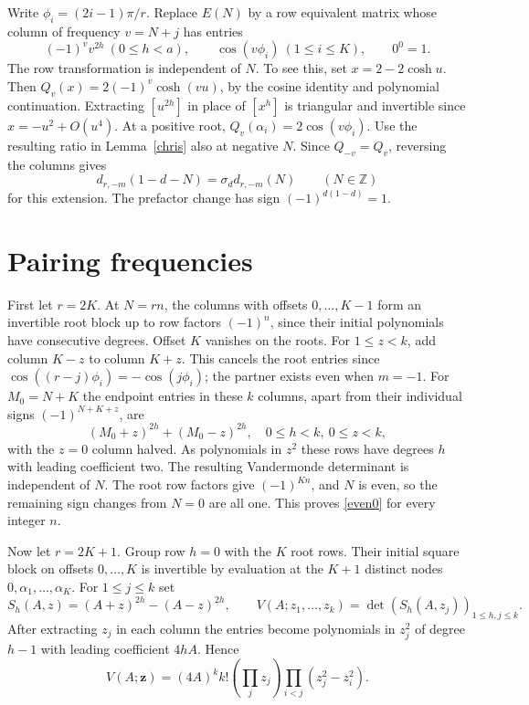 \documentclass[11pt]{article}
\newcommand{\Z}{\mathbb Z}
\begin{document}
Write $\phi_i=(2i-1)\pi/r$. Replace $E(N)$ by a row equivalent matrix whose column of frequency $v=N+j$ has entries
\[
 (-1)^v v^{2h}\ (0\le h<a),\qquad \cos(v\phi_i)\ (1\le i\le K),
 \qquad 0^0=1.
\]
The row transformation is independent of $N$. To see this, set $x=2-2\cosh u$. Then $Q_v(x)=2(-1)^v\cosh(vu)$, by the cosine identity and polynomial continuation. Extracting $[u^{2h}]$ in place of $[x^h]$ is triangular and invertible since $x=-u^2+O(u^4)$. At a positive root, $Q_v(\alpha_i)=2\cos(v\phi_i)$. Use the resulting ratio in Lemma~\ref{chris} also at negative $N$. Since $Q_{-v}=Q_v$, reversing the columns gives
\begin{equation}\label{reflect}
 d_{r,-m}(1-d-N)=\sigma_d d_{r,-m}(N)\qquad(N\in\Z)
\end{equation}
for this extension. The prefactor change has sign $(-1)^{d(1-d)}=1$.

\section{Pairing frequencies}
First let $r=2K$. At $N=rn$, the columns with offsets $0,\ldots,K-1$ form an invertible root block up to row factors $(-1)^n$, since their initial polynomials have consecutive degrees. Offset $K$ vanishes on the roots. For $1\le z<k$, add column $K-z$ to column $K+z$. This cancels the root entries since $\cos((r-j)\phi_i)=-\cos(j\phi_i)$; the partner exists even when $m=-1$. For $M_0=N+K$ the endpoint entries in these $k$ columns, apart from their individual signs $(-1)^{N+K+z}$, are
\[
 (M_0+z)^{2h}+(M_0-z)^{2h},\quad 0\le h<k,\ 0\le z<k,
\]
with the $z=0$ column halved. As polynomials in $z^2$ these rows have degrees $h$ with leading coefficient two. The resulting Vandermonde determinant is independent of $N$. The root row factors give $(-1)^{Kn}$, and $N$ is even, so the remaining sign changes from $N=0$ are all one. This proves \eqref{even0} for every integer $n$.

Now let $r=2K+1$. Group row $h=0$ with the $K$ root rows. Their initial square block on offsets $0,\ldots,K$ is invertible by evaluation at the $K+1$ distinct nodes $0,\alpha_1,\ldots,\alpha_K$. For $1\le j\le k$ set
\[
 S_h(A,z)=(A+z)^{2h}-(A-z)^{2h},\qquad
 V(A;z_1,\ldots,z_k)=\det(S_h(A,z_j))_{1\le h,j\le k}.
\]
After extracting $z_j$ in each column the entries become polynomials in $z_j^2$ of degree $h-1$ with leading coefficient $4hA$. Hence
\begin{equation}\label{v}
 V(A;\mathbf z)=(4A)^k k!\left(\prod_j z_j\right)
                       \prod_{i<j}(z_j^2-z_i^2).
\end{equation}
\end{document}
